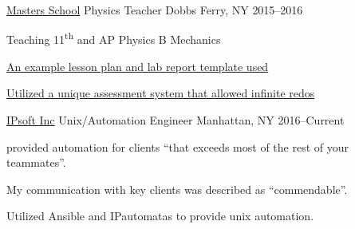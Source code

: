 \begin{cventries}
\cventry
    {\href{mastersny.org}{Masters School}}
    {Physics Teacher}
    {Dobbs Ferry, NY} {2015--2016}
    {
    \begin{cvitems}
      \item {Teaching 11\textsuperscript{th} and AP Physics B Mechanics}
      \item {\href{https://github.com/jphafner/physicsReport}{An example lesson plan and lab report template used}}
      \item {\href{https://github.com/jphafner/physicsAMC}{Utilized a unique assessment system that allowed infinite redos}}
    \end{cvitems}
    }

\cventry
    {\href{www.ipsoft.com}{IPsoft Inc}}
    {Unix/Automation Engineer}
    {Manhattan, NY}
    {2016--Current}
    {
    \begin{cvitems}
      \item {provided automation for clients ``that exceeds most of the rest of your teammates''.}
      \item {My communication with key clients was described as ``commendable''.} 
      \item {Utilized Ansible and IPautomatas to provide unix automation.} 
    \end{cvitems}
    }

\end{cventries}


